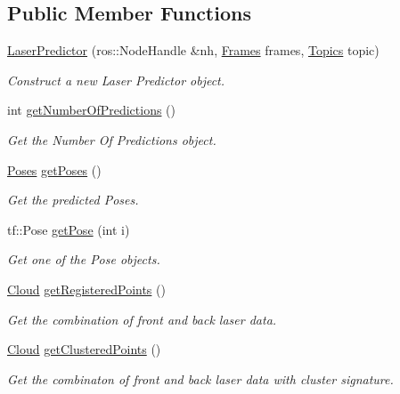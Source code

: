 \subsection*{Public Member Functions}
\begin{DoxyCompactItemize}
\item 
\hyperlink{classLaserPredictor_a8a1c3d15f619d2b4114ffa2907cddbfb}{Laser\+Predictor} (ros\+::\+Node\+Handle \&nh, \hyperlink{structLaserPredictor_1_1Frames}{Frames} frames, \hyperlink{classLaserPredictor_a3d60b85935a522f854a8f0a34bb7b3ca}{Topics} topic)
\begin{DoxyCompactList}\small\item\em Construct a new Laser Predictor object. \end{DoxyCompactList}\item 
int \hyperlink{classLaserPredictor_a9634b4a17a0fbef515cd95c7aab5832f}{get\+Number\+Of\+Predictions} ()
\begin{DoxyCompactList}\small\item\em Get the Number Of Predictions object. \end{DoxyCompactList}\item 
\hyperlink{classLaserPredictor_a6c7dc6bd4bfb6acd3d95e88e1b9b4be2}{Poses} \hyperlink{classLaserPredictor_a91056be74cceed6f4fa79154118b69c0}{get\+Poses} ()
\begin{DoxyCompactList}\small\item\em Get the predicted Poses. \end{DoxyCompactList}\item 
tf\+::\+Pose \hyperlink{classLaserPredictor_a3d5fcd96bfdb75a0ad582b14ff2e04dd}{get\+Pose} (int i)
\begin{DoxyCompactList}\small\item\em Get one of the Pose objects. \end{DoxyCompactList}\item 
\hyperlink{classLaserPredictor_ae6d64da5bf82f544a2ea8a421af5a677}{Cloud} \hyperlink{classLaserPredictor_aafd0b92c01204d5b6ce494944e1ff381}{get\+Registered\+Points} ()
\begin{DoxyCompactList}\small\item\em Get the combination of front and back laser data. \end{DoxyCompactList}\item 
\hyperlink{classLaserPredictor_ae6d64da5bf82f544a2ea8a421af5a677}{Cloud} \hyperlink{classLaserPredictor_a665b9b39107726f46c5258908fc0abe4}{get\+Clustered\+Points} ()
\begin{DoxyCompactList}\small\item\em Get the combinaton of front and back laser data with cluster signature. \end{DoxyCompactList}\item 

\end{DoxyCompactItemize}
